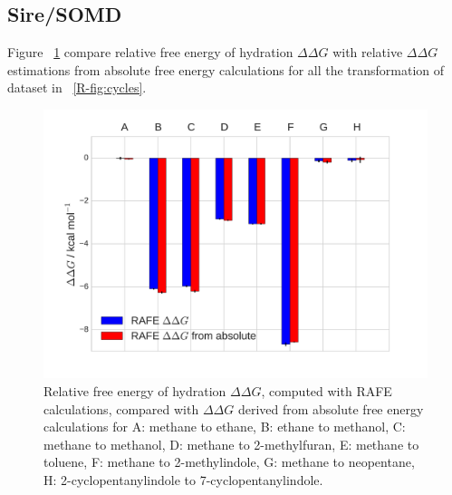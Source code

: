 \documentclass[journal=jctcce,manuscript=suppinfo]{achemso}
\begin{document}
\subsection{Sire/SOMD}
\label{sec:sire-probs}


Figure ~\ref{fig:sire_histogram} compare relative free energy of hydration 
$\Delta\Delta G$ with relative $\Delta\Delta G$ estimations from absolute free  
energy calculations for all the transformation of dataset in 
~\ref{R-fig:cycles}.
\begin{figure}[ht]
  \includegraphics[width=\textwidth]{figures/sire_histogram.pdf}
  \caption{Relative free energy of hydration $\Delta\Delta G$, computed with 
  RAFE calculations, compared with $\Delta\Delta G$ derived from absolute free 
  energy calculations for A: methane to ethane, B: ethane to methanol, C: 
  methane to methanol, D: methane to 2-methylfuran, E: methane to toluene,
    F: methane to 2-methylindole, G: methane to neopentane, H: 
    2-cyclopentanylindole to 7-cyclopentanylindole.}
  \label{fig:sire_histogram}
\end{figure}
\end{document}
